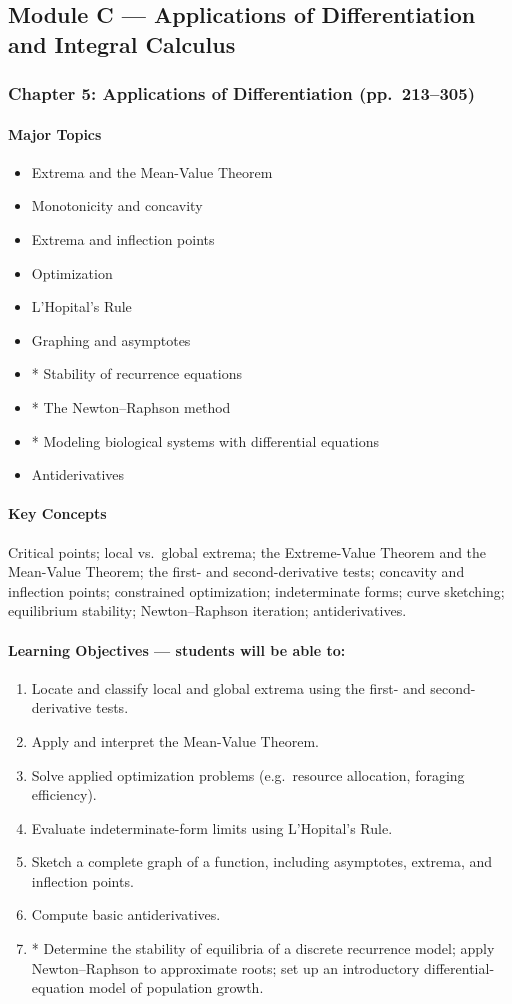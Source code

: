\documentclass[11pt]{article}
\newcommand{\ChapHead}[2]{\subsubsection{#1 \textnormal{\normalfont\normalsize\color{lightgray}(pp.\ #2)}}}
\newcommand{\MajorTopics}{\paragraph{Major Topics}}
\newcommand{\KeyConcepts}{\paragraph{Key Concepts}}
\newcommand{\LearnObj}{\paragraph{Learning Objectives --- students will be able to:}}
\begin{document}
\subsection{Module C --- Applications of Differentiation and Integral Calculus}

\ChapHead{Chapter 5: Applications of Differentiation}{213--305}

\MajorTopics
\begin{itemize}
\item Extrema and the Mean-Value Theorem
\item Monotonicity and concavity
\item Extrema and inflection points
\item Optimization
\item L'Hopital's Rule
\item Graphing and asymptotes
\item * Stability of recurrence equations
\item * The Newton--Raphson method
\item * Modeling biological systems with differential equations
\item Antiderivatives
\end{itemize}

\KeyConcepts
Critical points; local vs.\ global extrema; the Extreme-Value Theorem and
the Mean-Value Theorem; the first- and second-derivative tests;
concavity and inflection points; constrained optimization; indeterminate
forms; curve sketching; equilibrium stability; Newton--Raphson iteration;
antiderivatives.

\LearnObj
\begin{enumerate}
\item Locate and classify local and global extrema using the first- and second-derivative tests.
\item Apply and interpret the Mean-Value Theorem.
\item Solve applied optimization problems (e.g.\ resource allocation, foraging efficiency).
\item Evaluate indeterminate-form limits using L'Hopital's Rule.
\item Sketch a complete graph of a function, including asymptotes, extrema, and inflection points.
\item Compute basic antiderivatives.
\item * Determine the stability of equilibria of a discrete recurrence model; apply Newton--Raphson to approximate roots; set up an introductory differential-equation model of population growth.
\end{enumerate}
\end{document}
